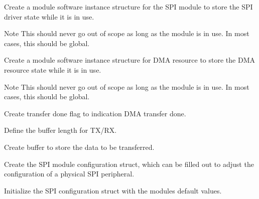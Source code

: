 \begin{DoxyEnumerate}
\item Create a module software instance structure for the S\+PI module to store the S\+PI driver state while it is in use. 
\begin{DoxyCodeInclude}{0}
\end{DoxyCodeInclude}
 \begin{DoxyNote}{Note}
This should never go out of scope as long as the module is in use. In most cases, this should be global.
\end{DoxyNote}

\item Create a module software instance structure for D\+MA resource to store the D\+MA resource state while it is in use. 
\begin{DoxyCodeInclude}{0}
\end{DoxyCodeInclude}
 \begin{DoxyNote}{Note}
This should never go out of scope as long as the module is in use. In most cases, this should be global.
\end{DoxyNote}

\item Create transfer done flag to indication D\+MA transfer done. 
\begin{DoxyCodeInclude}{0}
\end{DoxyCodeInclude}

\item Define the buffer length for T\+X/\+RX. 
\begin{DoxyCodeInclude}{0}
\end{DoxyCodeInclude}

\item Create buffer to store the data to be transferred. 
\begin{DoxyCodeInclude}{0}
\end{DoxyCodeInclude}

\item Create the S\+PI module configuration struct, which can be filled out to adjust the configuration of a physical S\+PI peripheral. 
\begin{DoxyCodeInclude}{0}
\end{DoxyCodeInclude}
 
\begin{DoxyCodeInclude}{0}
\end{DoxyCodeInclude}

\item Initialize the S\+PI configuration struct with the module\textquotesingle{}s default values. 
\begin{DoxyCodeInclude}{0}
\end{DoxyCodeInclude}
 

\end{DoxyEnumerate}
